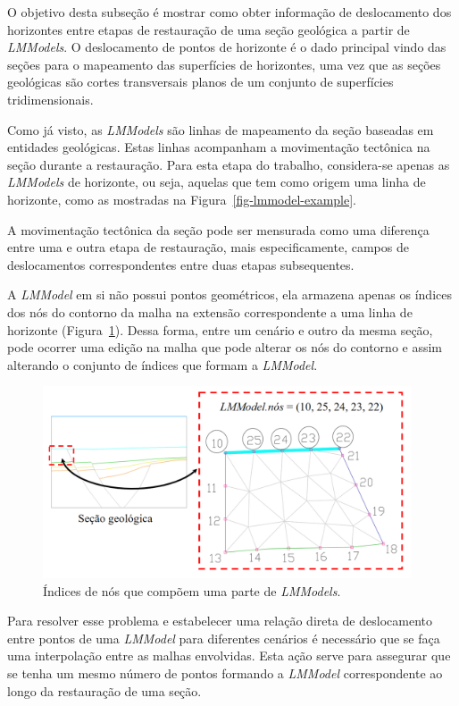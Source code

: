 O objetivo desta subseção é mostrar como obter informação de deslocamento dos horizontes entre etapas de restauração de uma seção geológica a partir de \textit{LMModels}. O deslocamento de pontos de horizonte é o dado principal vindo das seções para o mapeamento das superfícies de horizontes, uma vez que as seções geológicas são cortes transversais planos de um conjunto de superfícies tridimensionais.

Como já visto, as \textit{LMModels} são linhas de mapeamento da seção baseadas em entidades geológicas. Estas linhas acompanham a movimentação tectônica na seção durante a restauração. Para esta etapa do trabalho, considera-se apenas as \textit{LMModels} de horizonte, ou seja, aquelas que tem como origem uma linha de horizonte, como as mostradas na Figura~\ref{fig-lmmodel-example}.

A movimentação tectônica da seção pode ser mensurada como uma diferença entre uma e outra etapa de restauração, mais especificamente, campos de deslocamentos correspondentes entre duas etapas subsequentes.

A \textit{LMModel} em si não possui pontos geométricos, ela armazena apenas os índices dos nós do contorno da malha na extensão correspondente a uma linha de horizonte (Figura~\ref{fig-lmm-mesh-boundary}). Dessa forma, entre um cenário e outro da mesma seção, pode ocorrer uma edição na malha que pode alterar os nós do contorno e assim alterando o conjunto de índices que formam a \textit{LMModel}.

\begin{figure} [H]
  \begin{center}
    \includegraphics[width=310pt]{images/fig-lmm-mesh-boundary}
    \caption{Índices de nós que compõem uma parte de \textit{LMModels}.}\label{fig-lmm-mesh-boundary}
  \end{center}
\end{figure}

Para resolver esse problema e estabelecer uma relação direta de deslocamento entre pontos de uma \textit{LMModel} para diferentes cenários é necessário que se faça uma interpolação entre as malhas envolvidas. Esta ação serve para assegurar que se tenha um mesmo número de pontos formando a \textit{LMModel} correspondente ao longo da restauração de uma seção.

